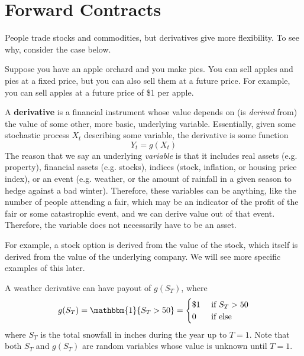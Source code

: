 \documentclass{article}
\begin{document}
\section{Forward Contracts} 

    People trade stocks and commodities, but derivatives give more flexibility. To see why, consider the case below. 

    \begin{example}
      Suppose you have an apple orchard and you make pies. You can sell apples and pies at a fixed price, but you can also sell them at a future price. For example, you can sell apples at a future price of \$1 per apple. 
    \end{example}

    \begin{definition}[Derivatives]
      A \textbf{derivative} is a financial instrument whose value depends on (is \textit{derived} from) the value of some other, more basic, underlying variable. Essentially, given some stochastic process $X_t$ describing some variable, the derivative is some function 
      \begin{equation}
        Y_t = g(X_t)
      \end{equation}
      The reason that we say an underlying \textit{variable} is that it includes real assets (e.g. property), financial assets (e.g. stocks), indices (stock, inflation, or housing price index), or an event (e.g. weather, or the amount of rainfall in a given season to hedge against a bad winter). Therefore, these variables can be anything, like the number of people attending a fair, which may be an indicator of the profit of the fair or some catastrophic event, and we can derive value out of that event. Therefore, the variable does not necessarily have to be an asset. 
    \end{definition}

    \begin{example}
      For example, a stock option is derived from the value of the stock, which itself is derived from the value of the underlying company. We will see more specific examples of this later. 
    \end{example}

    \begin{example}
      A weather derivative can have payout of $g(S_T)$, where 
      \begin{equation}
        g(S_T) = \mathbbm{1} \{S_T > 50\} = \begin{cases} \$1 & \text{ if } S_T > 50 \\ 0 & \text{ if else} \end{cases}
      \end{equation}
      where $S_T$ is the total snowfall in inches during the year up to $T = 1$. Note that both $S_T$ and $g(S_T)$ are random variables whose value is unknown until $T = 1$.
    \end{example}
\end{document}

